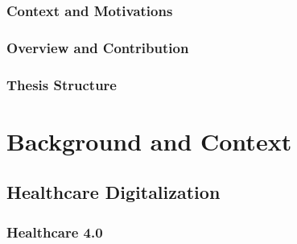 \documentclass[12pt,a4paper,openright,twoside]{book}
\begin{document}
\mainmatter

\label{chap:introduction}

\nocite{*}

\section*{Context and Motivations}

\section*{Overview and Contribution}

\section*{Thesis Structure}





\part{Background and Context}

\chapter{Healthcare Digitalization}
\label{chap:back:Healthcare}

\section{Healthcare 4.0}
\end{document}
